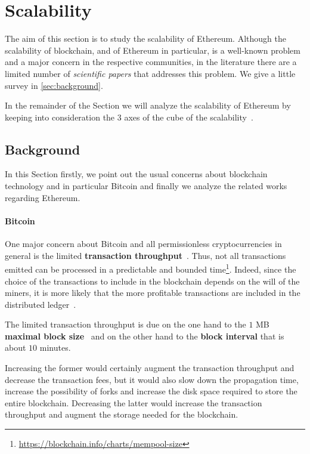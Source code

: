 \section{Scalability}
\label{sec:scalability}
The aim of this section is to study the scalability of Ethereum.
Although the scalability of blockchain, and of Ethereum in particular, is a
well-known problem and a major concern in the respective communities, in the
literature there are a limited number of \emph{scientific papers} that
addresses this problem.
We give a little survey in \autoref{sec:background}.

In the remainder of the Section we will analyze the scalability of Ethereum by
keeping into consideration the 3 axes of the cube of the
scalability~\cite{bib:art-of-scalability}.


\subsection{Background}

In this Section firstly, we point out the usual concerns about blockchain
technology and in particular Bitcoin and finally we analyze the related works
regarding Ethereum.

\paragraph{Bitcoin} 
One major concern about Bitcoin and all permissionless cryptocurrencies
in general is the limited \textbf{transaction
throughput}~\cite{bib:blockchain-challenges-opportunites-survey, bib:taxonomy}.
Thus, not all transactions emitted can be processed in a
predictable and bounded
time\footnote{\url{https://blockchain.info/charts/mempool-size}}.
Indeed, since the choice of the transactions
to include in the blockchain depends on the will of the miners,
it is more likely that the more profitable transactions are included
in the distributed
ledger~\cite{bib:blockchain-challenges-opportunites-survey,wood2018ethereum}.

The limited transaction throughput is due on the one hand to the
$1$ MB \textbf{maximal block size}~\cite{bib:masteringbitcoin} and on the other
hand to the \textbf{block interval} that is about $10$ minutes.

Increasing the former would certainly augment the transaction throughput and
decrease the transaction fees, but it would also slow down the propagation
time, increase the possibility of forks and increase the disk space required
to store the entire blockchain.
Decreasing the latter would increase the transaction throughput and augment
the storage needed for the blockchain.

